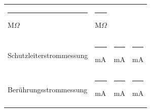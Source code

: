 \documentclass[11pt,a4paper,final,oneside,notitlepage]{report}
\begin{document}
\begin{tabularx}{\textwidth}{|p{}| p{}|p{}|p{}|}
		\cellcolor{gray!10}\rule{0.1\textwidth}{0.05mm}\hspace{0.5mm} M$\Omega$
		\makebox[0pt][l]{$\square$}\raisebox{.15ex}{\hspace{0.1em}} &
		\rule{0.1\textwidth}{0.05mm}\hspace{0.5mm} M$\Omega$
		\makebox[0pt][l]{$\square$}\raisebox{.15ex}{\hspace{0.1em}}\\
		{\scriptsize Schutzleiterstrommessung } &
		\rule{0.1\textwidth}{0.05mm}\hspace{1mm} mA
		\makebox[0pt][l]{$\square$}\raisebox{.15ex}{\hspace{0.1em}} &
		\cellcolor{gray!10}\rule{0.1\textwidth}{0.05mm}\hspace{1mm} mA
		\makebox[0pt][l]{$\square$}\raisebox{.15ex}{\hspace{0.1em}} &
		\rule{0.1\textwidth}{0.05mm}\hspace{1mm} mA
		\makebox[0pt][l]{$\square$}\raisebox{.15ex}{\hspace{0.1em}}\\
		{\scriptsize Berührungsstrommessung } &
		\rule{0.1\textwidth}{0.05mm}\hspace{1mm} mA
		\makebox[0pt][l]{$\square$}\raisebox{.15ex}{\hspace{0.1em}} &
		\cellcolor{gray!10}\rule{0.1\textwidth}{0.05mm}\hspace{1mm} mA
		\makebox[0pt][l]{$\square$}\raisebox{.15ex}{\hspace{0.1em}} &
		\rule{0.1\textwidth}{0.05mm}\hspace{1mm} mA
		\makebox[0pt][l]{$\square$}\raisebox{.15ex}{\hspace{0.1em}}\\
		

\end{tabularx}
\end{document}
